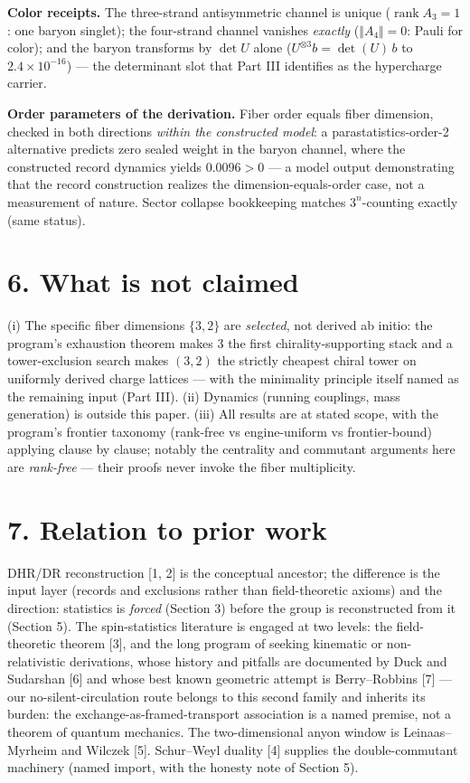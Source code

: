 \documentclass[11pt]{article}
\begin{document}
\textbf{Color receipts.}  The three-strand antisymmetric channel is unique ($\operatorname{rank} A_3 = 1$: one baryon singlet); the four-strand channel vanishes \emph{exactly} ($\Vert A_4\Vert = 0$: Pauli for color); and the baryon transforms by $\det U$ alone ($U^{\otimes 3} b = \det(U)\, b$ to $2.4\times 10^{-16}$) — the determinant slot that Part III identifies as the hypercharge carrier.

\textbf{Order parameters of the derivation.}  Fiber order equals fiber dimension, checked in both directions \emph{within the constructed model}: a parastatistics-order-2 alternative predicts zero sealed weight in the baryon channel, where the constructed record dynamics yields $0.0096 > 0$ — a model output demonstrating that the record construction realizes the dimension-equals-order case, not a measurement of nature.  Sector collapse bookkeeping matches $3^n$-counting exactly (same status).

\section*{6. What is not claimed}
(i) The specific fiber dimensions $\{3, 2\}$ are \emph{selected}, not derived ab initio: the program's exhaustion theorem makes $3$ the first chirality-supporting stack and a tower-exclusion search makes $(3,2)$ the strictly cheapest chiral tower on uniformly derived charge lattices — with the minimality principle itself named as the remaining input (Part III).  (ii) Dynamics (running couplings, mass generation) is outside this paper.  (iii) All results are at stated scope, with the program's frontier taxonomy (rank-free vs engine-uniform vs frontier-bound) applying clause by clause; notably the centrality and commutant arguments here are \emph{rank-free} — their proofs never invoke the fiber multiplicity.

\section*{7. Relation to prior work}
DHR/DR reconstruction [1, 2] is the conceptual ancestor; the difference is the input layer (records and exclusions rather than field-theoretic axioms) and the direction: statistics is \emph{forced} (Section 3) before the group is reconstructed from it (Section 5). The spin-statistics literature is engaged at two levels: the field-theoretic theorem [3], and the long program of seeking kinematic or non-relativistic derivations, whose history and pitfalls are documented by Duck and Sudarshan [6] and whose best known geometric attempt is Berry–Robbins [7] — our no-silent-circulation route belongs to this second family and inherits its burden: the exchange-as-framed-transport association is a named premise, not a theorem of quantum mechanics.  The two-dimensional anyon window is Leinaas–Myrheim and Wilczek [5]. Schur–Weyl duality [4] supplies the double-commutant machinery (named import, with the honesty note of Section 5).
\end{document}
